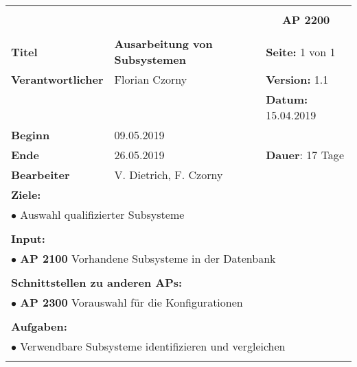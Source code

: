 \clearpage
\begin{table}[!h]
 \begin{center}
  \begin{tabular}{|p{35mm}||p{55mm}|p{50mm}||p{40mm}|}
   \hline
   \multicolumn{3}{|l||}{\textbf{}} & \multicolumn{1}{c|}{}\\
   \multicolumn{3}{|l||}{\textbf{}} & \multicolumn{1}{c|}{\textbf{AP 2200}}\\
   \multicolumn{3}{|l||}{\textbf{}} & \multicolumn{1}{c|}{}\\
   \hline\hline
   \textbf{Titel} & \multicolumn{2}{p{7cm}||}{\textbf{Ausarbeitung von Subsystemen}} & \textbf{Seite:} 1 von 1\\
   \hline
   \textbf{Verantwortlicher} & \multicolumn{2}{l||}{Florian Czorny} & \textbf{Version:} 1.1\\
   \hline
   \multicolumn{3}{|l||}{} & \textbf{Datum:} 15.04.2019\\
   \hline\hline
   \textbf{Beginn} & \multicolumn{2}{l||}{09.05.2019} & \\
   \hline
   \textbf{Ende} & \multicolumn{2}{l||}{26.05.2019} & \textbf{Dauer}: 17 Tage\\
   \hline\hline
   \textbf{Bearbeiter} & \multicolumn{3}{l|}{V. Dietrich, F. Czorny}\\
   \hline\hline
   \multicolumn{4}{|p{150mm}|}{\textbf{Ziele:}}\\
   \multicolumn{4}{|p{150mm}|}{$\bullet$ Auswahl qualifizierter Subsysteme}\\
   \multicolumn{4}{|p{150mm}|}{}\\
   \multicolumn{4}{|p{150mm}|}{\textbf{Input:}}\\
   \multicolumn{4}{|p{150mm}|}{$\bullet$ \textbf{AP 2100} Vorhandene Subsysteme in der Datenbank}\\
   \multicolumn{4}{|p{150mm}|}{}\\
   \multicolumn{4}{|p{150mm}|}{\textbf{Schnittstellen zu anderen APs:}}\\
   \multicolumn{4}{|p{150mm}|}{$\bullet$ \textbf{AP 2300} Vorauswahl für die Konfigurationen}\\
   \multicolumn{4}{|p{150mm}|}{}\\
   \multicolumn{4}{|p{150mm}|}{\textbf{Aufgaben:}}\\
   \multicolumn{4}{|p{150mm}|}{$\bullet$ Verwendbare Subsysteme identifizieren und vergleichen}\\
   \multicolumn{4}{|p{150mm}|}{}\\
   \hline
  \end{tabular}
 \end{center}
\end{table}

